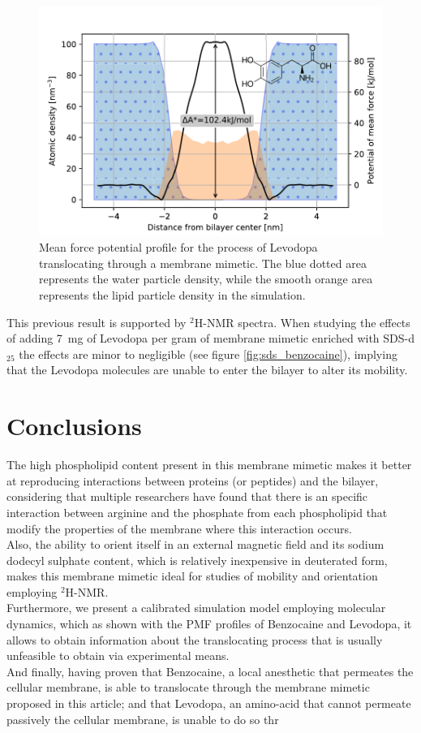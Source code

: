 \documentclass[twoside,twocolumn,9pt]{article}
\begin{document}
\begin{figure}[htb]
  \centering
  \includegraphics[width=\columnwidth]{ldopa_profile_density}    
  \caption{Mean force potential profile for the process of Levodopa
    translocating through a membrane mimetic. The blue dotted area represents
    the water particle density, while the smooth orange area represents the
    lipid particle density in the simulation.}
  \label{fig:levodopa_profile}
\end{figure}

This previous result is supported by $^2$H-NMR spectra. When studying the
effects of adding \SI{7}{mg} of Levodopa per gram of membrane mimetic enriched
with SDS-d$_{25}$ the effects are minor to negligible (see figure \ref{fig:sds_benzocaine}),
implying that the Levodopa molecules are unable to enter the bilayer to alter
its mobility.

\section{Conclusions}
The high phospholipid content present in this membrane mimetic makes it better
at reproducing interactions between proteins (or peptides) and the bilayer,
considering that multiple researchers\cite{Aliaga2011,Hristova2011} have found
that there is an specific interaction between arginine and the phosphate from
each phospholipid
that modify the properties of the membrane where this interaction occurs.\\
Also, the ability to orient itself in an external magnetic field and its sodium
dodecyl sulphate content, which is relatively inexpensive in deuterated form,
makes this membrane mimetic ideal for studies of mobility and orientation
employing $^2$H-NMR.\\
Furthermore, we present a calibrated simulation model employing molecular
dynamics, which as shown with the PMF profiles of Benzocaine and Levodopa, it
allows to obtain information about the translocating process that is usually
unfeasible to obtain via experimental means.\\
And finally, having proven that Benzocaine, a local anesthetic that permeates
the cellular membrane, is able to translocate through the membrane mimetic
proposed in this article; and that Levodopa, an amino-acid that cannot permeate
passively the cellular membrane, is unable to do so thr
\end{document}
